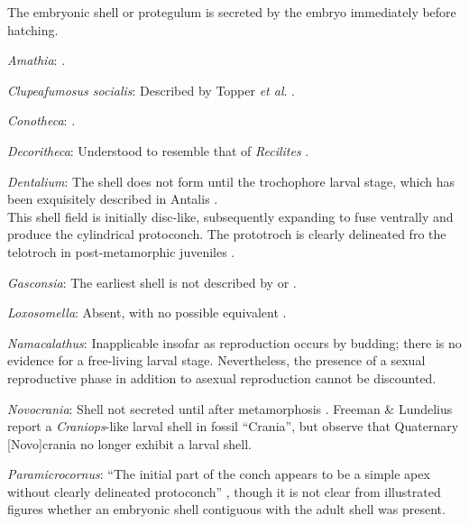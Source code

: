 \documentclass[openany]{book}
\theoremstyle{definition}
\theoremstyle{definition}
\theoremstyle{definition}
\theoremstyle{remark}
\begin{document}
The embryonic shell or protegulum is secreted by the embryo immediately
before hatching.

\hypertarget{Amathia-coding-1}{}
\emph{Amathia}: \citet{Reed1982}.

\hypertarget{Clupeafumosus_socialis-coding-1}{}
\emph{Clupeafumosus socialis}: Described by Topper \emph{et al}.
\citeyearpar{Topper2013Reappraisalof}.

\hypertarget{Conotheca-coding-1}{}
\emph{Conotheca}: \citep{Wrona2003}.

\hypertarget{Decoritheca-coding-1}{}
\emph{Decoritheca}: Understood to resemble that of \emph{Recilites}
\citep{Dzik1980Ontogenyof}.

\hypertarget{Dentalium-coding-1}{}
\emph{Dentalium}: The shell does not form until the trochophore larval
stage, which has been exquisitely described in Antalis
\citep{Wanninger2001}.\\
This shell field is initially disc-like, subsequently expanding to fuse
ventrally and produce the cylindrical protoconch. The prototroch is
clearly delineated fro the telotroch in post-metamorphic juveniles
\citep{Wanninger2001}.

\hypertarget{Gasconsia-coding-1}{}
\emph{Gasconsia}: The earliest shell is not described by
\citet{Hanken1985Thetaxonomy} or \citet{Watkins2002Newrecord}.

\hypertarget{Loxosomella-coding-1}{}
\emph{Loxosomella}: Absent, with no possible equivalent
\citep{Nielsen1966}.

\hypertarget{Namacalathus-coding-1}{}
\emph{Namacalathus}: Inapplicable insofar as reproduction occurs by
budding; there is no evidence for a free-living larval stage.
Nevertheless, the presence of a sexual reproductive phase in addition to
asexual reproduction cannot be discounted.

\hypertarget{Novocrania-coding-1}{}
\emph{Novocrania}: Shell not secreted until after metamorphosis
\citep{Popov2010Earliestontogeny}. Freeman \& Lundelius
\citeyearpar{Freeman1999Changesin} report a \emph{Craniops}-like larval
shell in fossil ``Crania'', but observe that Quaternary {[}Novo{]}crania
no longer exhibit a larval shell.

\hypertarget{Paramicrocornus-coding-1}{}
\emph{Paramicrocornus}: ``The initial part of the conch appears to be a
simple apex without clearly delineated protoconch''
\citep{Zhang2018Ahyolithid}, though it is not clear from illustrated
figures whether an embryonic shell contiguous with the adult shell was
present.
\end{document}
